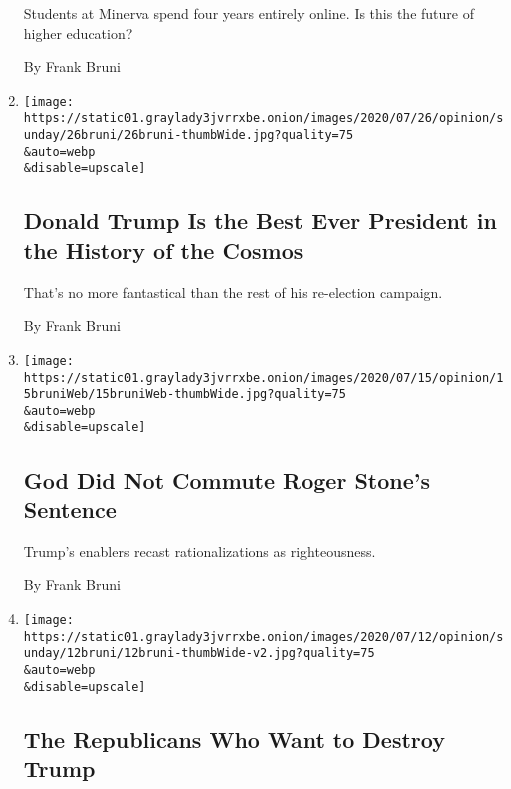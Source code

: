 \begin{enumerate}
  Students at Minerva spend four years entirely online. Is this the
  future of higher education?

  By Frank Bruni
\item
  \href{/2020/07/25/opinion/sunday/trump-lies.html}{}

  \texttt{[image: https://static01.graylady3jvrrxbe.onion/images/2020/07/26/opinion/sunday/26bruni/26bruni-thumbWide.jpg?quality=75\\\&auto=webp\\\&disable=upscale]}

  \hypertarget{donald-trump-is-the-best-ever-president-in-the-history-of-the-cosmos}{%
  \subsection{Donald Trump Is the Best Ever President in the History of
  the
  Cosmos}\label{donald-trump-is-the-best-ever-president-in-the-history-of-the-cosmos}}

  That's no more fantastical than the rest of his re-election campaign.

  By Frank Bruni
\item
  \href{/2020/07/15/opinion/roger-stone-trump-god.html}{}

  \texttt{[image: https://static01.graylady3jvrrxbe.onion/images/2020/07/15/opinion/15bruniWeb/15bruniWeb-thumbWide.jpg?quality=75\\\&auto=webp\\\&disable=upscale]}

  \hypertarget{god-did-not-commute-roger-stones-sentence}{%
  \subsection{God Did Not Commute Roger Stone's
  Sentence}\label{god-did-not-commute-roger-stones-sentence}}

  Trump's enablers recast rationalizations as righteousness.

  By Frank Bruni
\item
  \href{/2020/07/11/opinion/sunday/republican-party-trump-2020.html}{}

  \texttt{[image: https://static01.graylady3jvrrxbe.onion/images/2020/07/12/opinion/sunday/12bruni/12bruni-thumbWide-v2.jpg?quality=75\\\&auto=webp\\\&disable=upscale]}

  \hypertarget{the-republicans-who-want-to-destroy-trump}{%
  \subsection{The Republicans Who Want to Destroy
  Trump}\label{the-republicans-who-want-to-destroy-trump}}


\end{enumerate}
